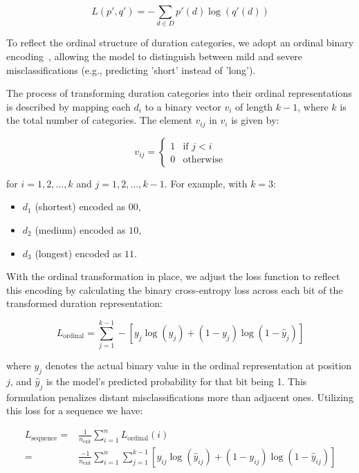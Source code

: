 \documentclass[preprint,12pt]{elsarticle}
\begin{document}
\begin{equation}
L(p', q') = -\sum_{d \in D} p'(d) \log(q'(d))
\end{equation}

To reflect the ordinal structure of duration categories, we adopt an ordinal binary encoding~\cite{frank2001simple}, allowing the model to distinguish between mild and severe misclassifications (e.g., predicting 'short' instead of 'long').

The process of transforming duration categories into their ordinal representations is described by mapping each \(d_i\) to a binary vector \(v_i\) of length \(k-1\), where \(k\) is the total number of categories. The element \(v_{ij}\) in \(v_i\) is given by:

\begin{equation}
v_{ij} = \begin{cases}
1 & \text{if } j < i \\
0 & \text{otherwise}
\end{cases}
\end{equation}

for \(i = 1, 2, \ldots, k\) and \(j = 1, 2, \ldots, k-1\). For example, with \(k = 3\):


\begin{itemize}
    \item \(d_1\) (shortest) encoded as \(00\),
    \item \(d_2\) (medium) encoded as \(10\),
    \item \(d_3\) (longest) encoded as \(11\).
\end{itemize}

With the ordinal transformation in place, we adjust the loss function to reflect this encoding by calculating the binary cross-entropy loss across each bit of the transformed duration representation:


\begin{equation}
L_{\text{ordinal}} = \sum_{j=1}^{k-1} -\left[ y_{j} \log(\hat{y}_{j}) + (1 - y_{j}) \log(1 - \hat{y}_{j}) \right]
\end{equation}

where \(y_{j}\) denotes the actual binary value in the ordinal representation at position \(j\), and \(\hat{y}_{j}\) is the model's predicted probability for that bit being 1. This formulation penalizes distant misclassifications more than adjacent ones. Utilizing this loss for a sequence we have:

\begin{equation}
\begin{split}
L_{\text{sequence}} = & \frac{1}{n_{\text{exit}}} \sum_{i=1}^{n} L_{\text{ordinal}}(i) \\
= & \frac{-1}{n_{\text{exit}}} \sum_{i=1}^{n} \sum_{j=1}^{k-1} \left[ y_{ij} \log(\hat{y}_{ij}) + (1 - y_{ij}) \log(1 - \hat{y}_{ij}) \right]
\end{split}
\end{equation}
\end{document}
